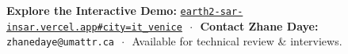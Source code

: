 \documentclass[10pt,letterpaper]{article}
\begin{document}
\vspace{-2pt}

\begin{tcolorbox}[colframe=altamiraemerald,colback=altamiraemerald,coltext=white,boxrule=0pt,top=4pt,bottom=4pt]
\centering\footnotesize
\textbf{Explore the Interactive Demo:} \href{https://earth2-sar-insar.vercel.app#city=it_venice&preset=sar_focus&stage=v3}{\texttt{earth2-sar-insar.vercel.app\#city=it\_venice}} $\,\cdot\,$ 
\textbf{Contact Zhane Daye:} \texttt{zhanedaye@umattr.ca} $\,\cdot\,$ Available for technical review \& interviews.
\end{tcolorbox}
\end{document}
